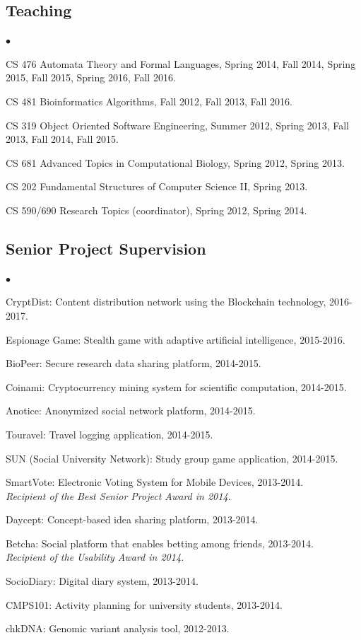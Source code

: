 \documentclass[margin,line]{res}
\newenvironment{list2}{
  \begin{list}{$\bullet$}{%
      \setlength{\itemsep}{0in}
      \setlength{\parsep}{0in} \setlength{\parskip}{0in}
      \setlength{\topsep}{0in} \setlength{\partopsep}{0in} 
      \setlength{\leftmargin}{0.2in}}}{\end{list}}
\begin{document}
\begin{resume}
  \clearpage
\vspace{-0.6cm}
\subsection{\small \sc Teaching}
\begin{list2}
  \item CS 476 Automata Theory and Formal Languages, Spring 2014, Fall 2014, Spring 2015, Fall 2015, Spring 2016, Fall 2016.
  \item CS 481 Bioinformatics Algorithms, Fall 2012, Fall 2013, Fall 2016.
  \item CS 319 Object Oriented Software Engineering, Summer 2012, Spring 2013, Fall 2013, Fall 2014, Fall 2015.
  \item CS 681 Advanced Topics in Computational Biology, Spring 2012, Spring 2013.
  \item CS 202 Fundamental Structures of Computer Science II, Spring 2013.
  \item CS 590/690 Research Topics (coordinator), Spring 2012, Spring 2014.
\end{list2}


\vspace{-0.6cm}
\subsection{\small \sc Senior Project Supervision}
\begin{list2}
  \item CryptDist: Content distribution network using the Blockchain technology, 2016-2017.
\item Espionage Game: Stealth game with adaptive artificial intelligence, 2015-2016.
  \item BioPeer: Secure research data sharing platform, 2014-2015.
  \item Coinami: Cryptocurrency mining system for scientific computation, 2014-2015.
  \item Anotice: Anonymized social network platform, 2014-2015.
  \item Touravel: Travel logging application, 2014-2015. 
  \item SUN (Social University Network): Study group game application, 2014-2015.
  \item SmartVote: Electronic Voting System for Mobile Devices, 2013-2014. \\
    {\it Recipient of the Best Senior Project Award in 2014.}
  \item Daycept: Concept-based idea sharing platform, 2013-2014.
  \item Betcha: Social platform that enables betting among friends, 2013-2014.\\
    {\it Recipient of the Usability Award in 2014.}
  \item SocioDiary: Digital diary system, 2013-2014.
  \item CMPS101: Activity planning for university students, 2013-2014.
  \item chkDNA: Genomic variant analysis tool, 2012-2013.
\end{list2}



\end{resume}
\end{document}
